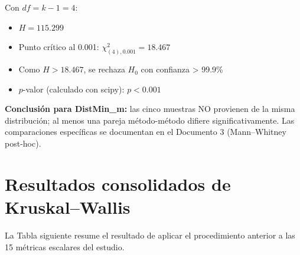 \documentclass[12pt,a4paper,oneside]{book}
\begin{document}
Con $df = k-1 = 4$:
\begin{itemize}
    \item $H = 115.299$
    \item Punto crítico al 0.001: $\chi^2_{(4),0.001} = 18.467$
    \item Como $H > 18.467$, se rechaza $H_0$ con confianza > 99.9\%
    \item $p$-valor (calculado con scipy): $p < 0.001$
\end{itemize}

\textbf{Conclusión para DistMin\_m:} las cinco muestras NO provienen de la misma distribución; al menos una pareja método-método difiere significativamente. Las comparaciones específicas se documentan en el Documento 3 (Mann--Whitney post-hoc).

\newpage
\section{Resultados consolidados de Kruskal--Wallis}

La Tabla siguiente resume el resultado de aplicar el procedimiento anterior a las 15 métricas escalares del estudio.
\end{document}
